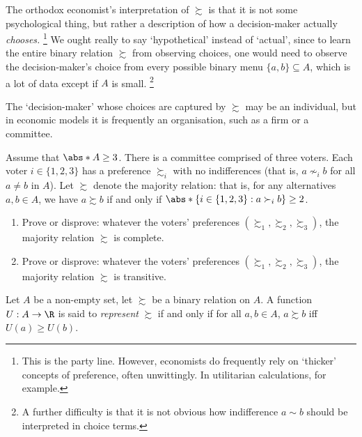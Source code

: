 \documentclass[11pt,letterpaper,reqno,oneside]{book}
\begin{document}
The orthodox economist's interpretation of $\succsim$ is that it is not some psychological thing, but rather a description of how a decision-maker actually \emph{chooses.}%
	\footnote{This is the party line. However, economists do frequently rely on `thicker' concepts of preference, often unwittingly. In utilitarian calculations, for example.}
We ought really to say `hypothetical' instead of `actual', since to learn the entire binary relation $\succsim$ from observing choices, one would need to observe the decision-maker's choice from every possible binary menu $\{a,b\} \subseteq A$, which is a lot of data except if $A$ is small.%
	\footnote{A further difficulty is that it is not obvious how indifference $a \sim b$ should be interpreted in choice terms.}

The `decision-maker' whose choices are captured by $\succsim$ may be an individual, but in economic models it is frequently an organisation, such as a firm or a committee.

\begin{exercise}
	\label{exercise:condorcet}
	Assume that $\abs*{A} \geq 3$. There is a committee comprised of three voters. Each voter $i \in \{1,2,3\}$ has a preference $\succsim_i$ with no indifferences (that is, $a \nsim_i b$ for all $a \neq b$ in $A$). Let $\succsim$ denote the majority relation: that is, for any alternatives $a,b \in A$, we have $a \succsim b$ if and only if $\abs*{ 
	\{ i \in \{1,2,3\} : a \succ_i b \} } \geq 2$.

	\begin{enumerate}[label=(\alph*)]
	
		\item Prove or disprove: whatever the voters' preferences $(\mathord{\succsim_1},\mathord{\succsim_2},\mathord{\succsim_3})$, the majority relation $\succsim$ is complete.

		\item Prove or disprove: whatever the voters' preferences $(\mathord{\succsim_1},\mathord{\succsim_2},\mathord{\succsim_3})$, the majority relation $\succsim$ is transitive.
	
	\end{enumerate}
\end{exercise}

\begin{definition}
	\label{definition:utility}
	Let $A$ be a non-empty set, let $\succsim$ be a binary relation on $A$. A function $U : A \to \R$ is said to \emph{represent} $\succsim$ if and only if for all $a,b \in A$, $a \succsim b$ iff $U(a) \geq U(b)$.
\end{definition}
\end{document}
